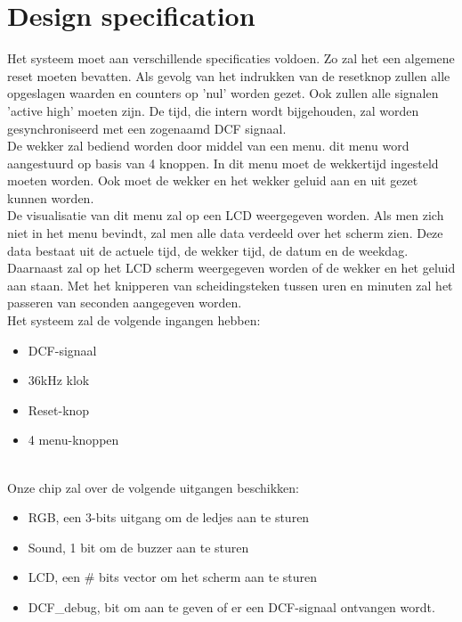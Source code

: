 \chapter{Design specification}
Het systeem moet aan verschillende specificaties voldoen. Zo zal het een algemene reset moeten bevatten. Als gevolg van het indrukken van de resetknop zullen alle opgeslagen waarden en counters op 'nul' worden gezet. Ook zullen alle signalen 'active high' moeten zijn. De tijd, die intern wordt bijgehouden, zal worden gesynchroniseerd met een zogenaamd DCF signaal.\\
De wekker zal bediend worden door middel van een menu. dit menu word aangestuurd op basis van 4 knoppen. In dit menu moet de wekkertijd ingesteld moeten worden. Ook moet de wekker en het wekker geluid aan en uit gezet kunnen worden.\\
De visualisatie van dit menu zal op een LCD weergegeven worden. Als men zich niet in het menu bevindt, zal men alle data verdeeld over het scherm zien. Deze data bestaat uit de actuele tijd, de wekker tijd, de datum en de weekdag. Daarnaast zal op het LCD scherm weergegeven worden of de wekker en het geluid aan staan. Met het knipperen van scheidingsteken tussen uren en minuten zal het passeren van seconden aangegeven worden.\\
Het systeem zal de volgende ingangen hebben:
\begin{itemize}[nolistsep]
\item	DCF-signaal
\item	36kHz klok
\item	Reset-knop
\item	4 menu-knoppen
\end{itemize}

\noindent
\\
Onze chip zal over de volgende uitgangen beschikken:
\begin{itemize}[nolistsep]
\item	RGB, een 3-bits uitgang om de ledjes aan te sturen
\item	Sound, 1 bit om de buzzer aan te sturen
\item	LCD, een \# bits vector om het scherm aan te sturen
\item	DCF\_debug, bit om aan te geven of er een DCF-signaal ontvangen wordt.
\end{itemize}
